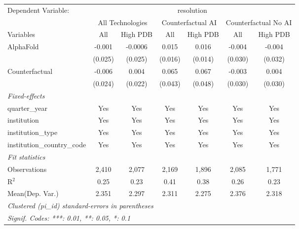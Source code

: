 \begingroup
\centering
\begin{tabular}{lcccccc}
   \tabularnewline \midrule \midrule
   Dependent Variable: & \multicolumn{6}{c}{resolution}\\
 & \multicolumn{2}{c}{All Technologies} & \multicolumn{2}{c}{Counterfactual AI} & \multicolumn{2}{c}{Counterfactual No AI} \\
\cmidrule(lr){1-1}\cmidrule(lr){2-3} \cmidrule(lr){4-5} \cmidrule(lr){6-7}
Variables & \multicolumn{1}{c}{All} & \multicolumn{1}{c}{High PDB} & \multicolumn{1}{c}{All} & \multicolumn{1}{c}{High PDB} & \multicolumn{1}{c}{All} & \multicolumn{1}{c}{High PDB} \\
\cmidrule(lr){1-1}\cmidrule(lr){2-2} \cmidrule(lr){3-3} \cmidrule(lr){4-4} \cmidrule(lr){5-5} \cmidrule(lr){6-6} \cmidrule(lr){7-7}
   AlphaFold                    & -0.001  & -0.0006 & 0.015   & 0.016   & -0.004  & -0.004\\   
                                & (0.025) & (0.025) & (0.016) & (0.014) & (0.030) & (0.032)\\   
   Counterfactual               & -0.006  & 0.004   & 0.065   & 0.067   & -0.003  & 0.004\\   
                                & (0.024) & (0.022) & (0.043) & (0.048) & (0.030) & (0.030)\\   
   \midrule
   \emph{Fixed-effects}\\
   quarter\_year                & Yes     & Yes     & Yes     & Yes     & Yes     & Yes\\  
   institution                  & Yes     & Yes     & Yes     & Yes     & Yes     & Yes\\  
   institution\_type            & Yes     & Yes     & Yes     & Yes     & Yes     & Yes\\  
   institution\_country\_code   & Yes     & Yes     & Yes     & Yes     & Yes     & Yes\\  
   \midrule
   \emph{Fit statistics}\\
   Observations                 & 2,410   & 2,077   & 2,169   & 1,896   & 2,085   & 1,771\\  
   R$^2$                        & 0.25    & 0.23    & 0.41    & 0.38    & 0.26    & 0.23\\  
Mean(Dep. Var.) & 2.351 & 2.297 & 2.311 & 2.275 & 2.376 & 2.318 \\
   \midrule \midrule
   \multicolumn{7}{l}{\emph{Clustered (pi\_id) standard-errors in parentheses}}\\
   \multicolumn{7}{l}{\emph{Signif. Codes: ***: 0.01, **: 0.05, *: 0.1}}\\
\end{tabular}
\par\endgroup
